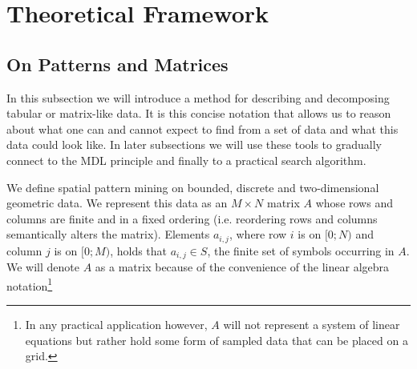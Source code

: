 \documentclass{llncs}
\begin{document}
\section{Theoretical Framework}

\subsection{On Patterns and Matrices}

In this subsection we will introduce a method for describing and decomposing tabular or matrix-like data. It is this concise notation that allows us to reason about what one can and cannot expect to find from a set of data and what this data could look like. In later subsections we will use these tools to gradually connect to the MDL principle and finally to a practical search algorithm.

We define spatial pattern mining on bounded, discrete and two-dimensional geometric data. We represent this data as an $M\times N$ matrix $A$ whose rows and columns are finite and in a fixed ordering (i.e. reordering rows and columns semantically alters the matrix). Elements $a_{i,j}$, where row $i$ is on $[0;N)$ and column $j$ is on $[0;M)$, holds that $a_{i,j} \in S$, the finite set of symbols occurring in $A$. We will denote $A$ as a matrix because of the convenience of the linear algebra notation\footnote{In any practical application however, $A$ will not represent a system of linear equations but rather hold some form of sampled data that can be placed on a grid.}


\begin{figure}

\label{example1}
\end{figure}
\end{document}
